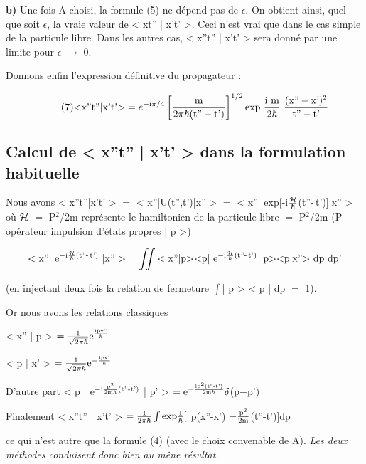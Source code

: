 {\bf b)} Une fois A choisi, la formule (5) ne dépend pas de $\epsilon$. On obtient ainsi,
quel que soit $\epsilon$, la vraie valeur de < xt'' | x't' >. Ceci n'est vrai que
dans le cas simple de la particule libre. Dans les autres cas,
< x''t'' | x't' > sera donné par une limite pour $\epsilon$ $\to$ 0.

Donnons enfin l'expression définitive du propagateur :

\[
\tag{7} \mt{<x''t''|x't'>} =  e^{-\mt{i}\pi/4}
\left[\frac{\mt{m}}{2\pi\hbar(\mt{t''}-\mt{t'})}\right]^{1/2}
\mt{exp}\ \frac{\mt{i m}}{2\hbar}\ \frac{(\mt{x''}-\mt{x'})^2}{\mt{t''}-\mt{t'}}
\]
\subsection{Calcul de < x''t'' | x't' > dans la formulation habituelle} %

Nous avons < x''t''|x't' > $=$ < x''|U(t'',t')|x'' > $=$
< x''| exp[-i$\frac{\mathcal{H}}{\hbar}$(t''-\,t')$]$|x'' >
où $\mathcal{H}$ $=$ P$^2$/2m représente le hamiltonien de la particule
libre  $=$ P$^2$/2m (P opérateur impulsion d'états propres | p >)

\[
\text{< x''| }\text{e}^{-\text{i}\frac{\mathcal{H}}{\hbar}\text{(t''-\,t')}}\text{ |x'' >} = \iint
\text{< x''|p><p| }\text{e}^{-\text{i}\frac{\mathcal{H}}{\hbar}\text{(t''-\,t')}}\text{ |p><p|x''> dp dp'}
\]

(en injectant deux fois la relation de fermeture $\int$| p > < p | dp $=$ 1).

Or nous avons les relations classiques
\begin{center}
< x'' | p > $= \frac{1}{\sqrt{2\pi\hbar}}\text{e}^{\frac{\text{ipx''}}{\hbar}}$
\end{center}
\begin{center}
< p | x' > $= \frac{1}{\sqrt{2\pi\hbar}}\text{e}^{-\frac{\text{ipx'}}{\hbar}}$
\end{center}

%
\begin{center}
D'autre part < p | $\text{e}^{-\text{i}\frac{\text{p}^2}{2\text{m}\hbar}\text{(t''-t')}}$
| p' > $= \text{e}^{-\frac{\text{ip}^2\text{(t''-t')}}{2\text{m}\hbar}} \delta$(p$-$p')
\end{center}
\begin{center}
Finalement < x''t'' | x't' >
$=\frac{1}{2\pi\hbar}
\int\text{exp}\frac{1}{\hbar}[$
p(x''-x')
$-\frac{\text{p}^2}{2\text{m}}$(t''-t')$]$dp
\end{center}

ce qui n'est autre que la formule (4) (avec le choix convenable de A).
{\it Les deux méthodes conduisent donc bien au mêne résultat.}

